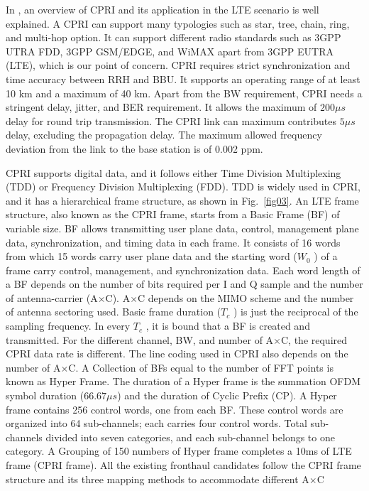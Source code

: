 \begin{multicols}{2}
In \cite{art3-key39}, an overview of CPRI and its application in the LTE scenario is well explained. A CPRI can support many typologies such as star, tree, chain, ring, and multi-hop option. It can support different radio standards such as 3GPP UTRA FDD, 3GPP GSM/EDGE, and WiMAX apart from 3GPP EUTRA (LTE), which is our point of concern. CPRI requires strict synchronization and time accuracy between RRH and BBU. It supports an operating range of at least 10 km and a maximum of 40 km. Apart from the BW requirement, CPRI needs a stringent delay, jitter, and BER requirement. It allows the maximum of $200 \mu s$ delay for round trip transmission. The CPRI link can maximum contributes $5 \mu s$ delay, excluding the propagation delay. The maximum allowed frequency deviation from the link to the base station is of 0.002 ppm.

CPRI supports digital data, and it follows either Time Division Multiplexing (TDD) or Frequency Division Multiplexing (FDD). TDD is widely used in CPRI, and it has a hierarchical frame structure, as shown in Fig.~\ref{fig03}. An LTE frame structure, also known as the CPRI frame, starts from a Basic Frame (BF) of variable size. BF allows transmitting user plane data, control, management plane data, synchronization, and timing data in each frame. It consists of 16 words from which 15 words carry user plane data and the starting word ($W_{0}$ ) of a  frame carry control, management, and synchronization data. Each word length of a BF depends on the number of bits required per I and Q sample and the number of antenna-carrier (A$\times$C). A$\times$C depends on the MIMO scheme and the number of antenna sectoring used. Basic frame duration ($T_{c}$ ) is just the reciprocal of the sampling frequency. In every $T_{c}$ , it is bound that a BF is created and transmitted. For the different channel, BW, and number of A$\times$C, the required CPRI data rate is different. The line coding used in CPRI also depends on the number of A$\times$C. A Collection of BFs equal to the number of FFT points is known as Hyper Frame. The duration of a Hyper frame is the summation OFDM symbol duration ($66.67 \mu s$) and the duration of Cyclic Prefix (CP). A Hyper frame contains 256 control words, one from each BF. These control words are organized into 64 sub-channels; each carries four control words. Total sub-channels divided into seven categories, and each sub-channel belongs to one category. A Grouping of 150 numbers of Hyper frame completes a 10ms of LTE frame (CPRI frame). All the existing fronthaul candidates follow the CPRI frame structure and its three mapping methods to accommodate different A$\times$C


\end{multicols}
